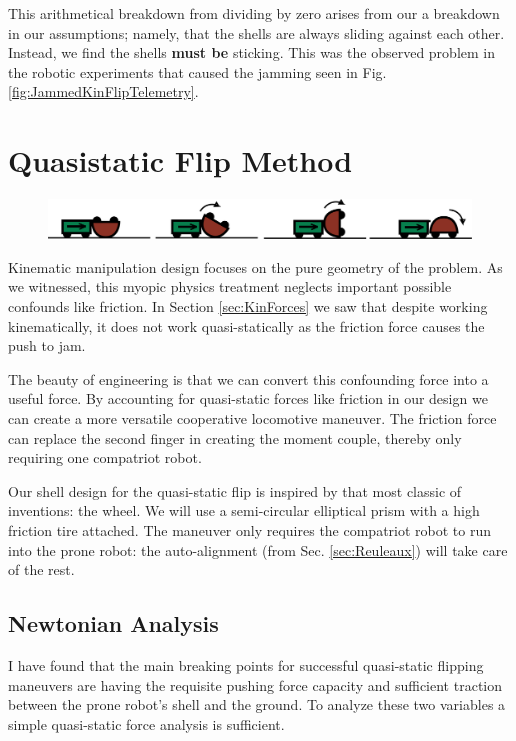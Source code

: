 \documentclass[letterpaper]{report}
\begin{document}
This arithmetical breakdown from dividing by zero arises from our a breakdown in our assumptions; namely, that the shells are always sliding against each other.
Instead, we find the shells \textbf{must be} sticking.
This was the observed problem in the robotic experiments that caused the jamming seen in Fig. \ref{fig:JammedKinFlipTelemetry}.

\chapter{Quasistatic Flip Method}
\begin{figure}[ht]
\centering
\includegraphics[width=1.0\textwidth]{QuasiStatic_CoopCartoon.png}
\end{figure}

Kinematic manipulation design focuses on the pure geometry of the problem.
As we witnessed, this myopic physics treatment neglects important possible confounds like friction.
In Section \ref{sec:KinForces} we saw that despite working kinematically, it does not work quasi-statically as the friction force causes the push to jam.

The beauty of engineering is that we can convert this confounding force into a useful force.
By accounting for quasi-static forces like friction in our design we can create a more versatile cooperative locomotive maneuver.
The friction force can replace the second finger in creating the moment couple, thereby only requiring one compatriot robot.

Our shell design for the quasi-static flip is inspired by that most classic of inventions: the wheel.
We will use a semi-circular elliptical prism with a high friction tire attached.
The maneuver only requires the compatriot robot to run into the prone robot: the auto-alignment (from Sec. \ref{sec:Reuleaux}) will take care of the rest.

\section{Newtonian Analysis}
I have found that the main breaking points for successful quasi-static flipping maneuvers are having the requisite pushing force capacity and sufficient traction between the prone robot's shell and the ground.
To analyze these two variables a simple quasi-static force analysis is sufficient.
\end{document}
